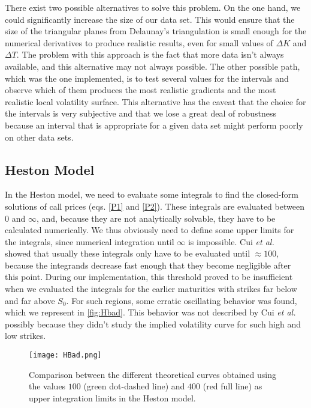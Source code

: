 There exist two possible alternatives to solve this problem.
On the one hand, we could significantly increase the size of our data set. This would ensure that the size of the triangular planes from Delaunay's triangulation is small enough for the numerical derivatives to produce realistic results, even for small values of $\Delta K$ and $\Delta T$. The problem with this approach is the fact that more data isn't always available, and this alternative may not always  possible.
The other possible path, which was the one implemented, is to test several values for the intervals and observe which of them produces the most realistic gradients and the most realistic local volatility surface. This alternative has the caveat that the choice for the intervals is very subjective and that we lose a great deal of robustness because an interval that is appropriate for a given data set might perform poorly on other data sets.

\vfill
\newpage

\subsection{Heston Model}
In the Heston model, we need to evaluate some integrals to find the closed-form solutions of call prices (eqs. \eqref{P1} and \eqref{P2}).
These integrals are evaluated between $0$ and $\infty$, and, because they are not analytically solvable, they have to be calculated numerically.
We thus obviously need to define some upper limits for the integrals, since numerical integration until $\infty$ is impossible. Cui \textit{et al.}~\citep{Cui} showed that usually these integrals only have to be evaluated until $\approx100$, because the integrands decrease fast enough that they become negligible after this point. During our implementation, this threshold proved to be insufficient when we evaluated the integrals for the earlier maturities with strikes far below and far above $S_0$. For such regions, some erratic oscillating behavior was found, which we represent in \autoref{fig:Hbad}. This behavior was not described by Cui \textit{et al.} possibly because they didn't study the implied volatility curve for such high and low strikes.



\begin{figure}[H]
    \centering
      \texttt{[image: HBad.png]}
      \caption[Comparison between the different theoretical curves obtained using different values for the upper integration limits in the Heston model.]{Comparison between the different theoretical curves obtained using the values $100$ (green dot-dashed line) and $400$ (red full line) as upper integration limits in the Heston model.}\label{fig:Hbad}
    \end{figure}

